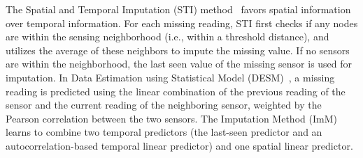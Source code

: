The Spatial and Temporal Imputation (STI) method~\cite{li2008spatial}
favors spatial information over temporal information.  For each
missing reading, STI first checks if any nodes are within the sensing
neighborhood (i.e., within a threshold distance), and utilizes the average of these neighbors to impute the
missing value. If no sensors are within the neighborhood, the last
seen value of the missing sensor is used for imputation.
In Data Estimation using Statistical Model (DESM)~\cite{li2008data}, a
missing reading is predicted using the linear combination of the
previous reading of the sensor and the current reading of the
neighboring sensor, weighted by the Pearson correlation between the
two sensors.  The Imputation Method (ImM)~\cite{Lim:robust} learns to combine two temporal predictors 
(the last-seen predictor and an autocorrelation-based temporal linear predictor) and one spatial 
linear predictor.



